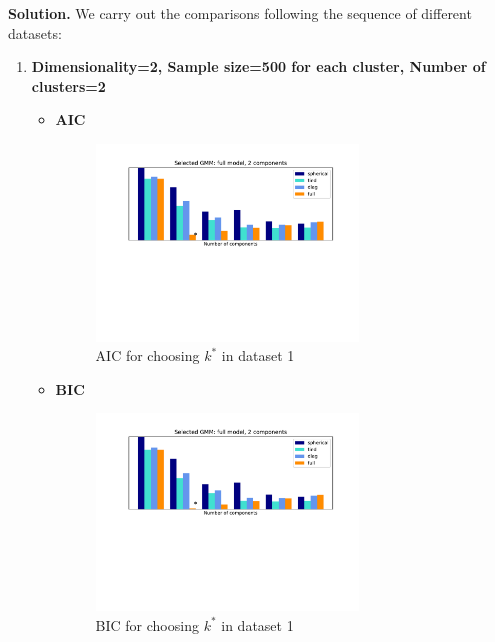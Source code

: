 \documentclass[12pt,a4paper,UTF8,fntef]{article}
\begin{document}
\textbf{Solution.} We carry out the comparisons following the sequence of different datasets:
\begin{enumerate}
	\item \textbf{Dimensionality=2, Sample size=500 for each cluster, Number of clusters=2}
	\begin{itemize}
		\item \textbf{AIC}
		\begin{figure}[!h]
			\centering
			\includegraphics[width=0.7\textwidth]{AIC_1.pdf}
			\caption{AIC for choosing $k^*$ in dataset 1}
		\end{figure}
		\item \textbf{BIC}
		\begin{figure}[!h]
			\centering
			\includegraphics[width=0.7\textwidth]{BIC_1.pdf}
			\caption{BIC for choosing $k^*$ in dataset 1}
		\end{figure}
	

\end{itemize}
\end{enumerate}
\end{document}
